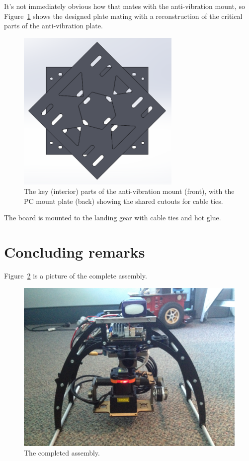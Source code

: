 \documentclass[12pt,oneside,a4paper,draft]{book}
\begin{document}
It's not immediately obvious how that mates with the anti-vibration
mount, so Figure~\ref{fig:pc-avm-mount} shows the designed plate
mating with a reconstruction of the critical parts of the
anti-vibration plate.

\begin{figure}[h]
  \centering
  \includegraphics[width=0.7\textwidth]{figs/pc-avm}
  \caption{The key (interior) parts of the anti-vibration mount (front), with the PC mount plate (back) showing the shared cutouts for cable ties.}
  \label{fig:pc-avm-mount}
\end{figure}
The board is mounted to the landing gear with cable ties and hot glue.
\newpage~\newpage
\section{Concluding remarks}
\label{sec:concluding-remarks}

Figure~\ref{fig:mk2} is a picture of the complete assembly.

\begin{figure}[h!]
  \centering
  \includegraphics[width=\textwidth]{figs/mk2}
  \caption{The completed assembly.}
  \label{fig:mk2}
\end{figure}
\end{document}

